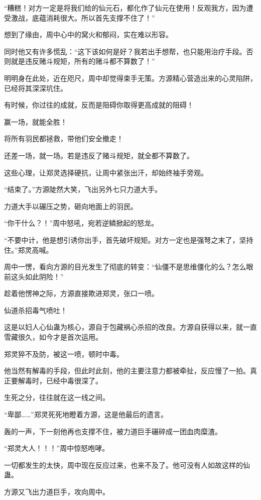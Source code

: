 \begin{this_body}
“糟糕！对方一定是将我们给的仙元石，都化作了仙元在使用！反观我方，因为遭受激战，底蕴消耗很大。所以首先支撑不住了！”

想到了缘由，周中心中的窝火和郁闷，实在难以形容。

同时他又有许多慌乱：“这下该如何是好？我若出手想帮，也只能用治疗手段。否则就是违反赌斗规矩，所有的赌斗都不算数了！”

明明身在此处，近在咫尺，周中却觉得束手无策。方源精心营造出来的心灵陷阱，已经将其深深坑住。

有时候，你过往的成就，反而是阻碍你取得更高成就的阻碍！

赢一场，就能全胜！

将所有羽民都拯救，带他们安全撤走！

还差一场，就一场。若是违反了赌斗规矩，就全都不算数了。

这些心理，让郑灵选择硬抗，让周中紧张出汗，却始终袖手旁观。

“结束了。”方源陡然大笑，飞出另外七只力道大手。

力道大手以碾压之势，砸向地面上的羽民。

“你干什么？！”周中怒吼，宛若逆鳞掀起的怒龙。

“不要中计，他是想引诱你出手，首先破坏规矩。对方一定也是强弩之末了，坚持住。”郑灵高喊。

周中一愣，看向方源的目光发生了彻底的转变：“仙僵不是思维僵化的么？怎么眼前这头如此阴险！”

趁着他愣神之际，方源直接欺进郑灵，张口一喷。

仙道杀招毒气喷吐！

这是以妇人心仙蛊为核心，源自于包藏祸心杀招的改良。方源自获得以来，就一直雪藏很久，如今才是首次运用。

郑灵猝不及防，被这一喷，顿时中毒。

他当然有解毒的手段，但此时此刻，他的主要注意力都被牵扯，反应慢了一拍。真正要解毒时，已经中毒很深了。

生死之分，往往就在这一线之间。

“卑鄙……”郑灵死死地瞪着方源，这是他最后的遗言。

轰的一声，下一刻他再也支撑不住，被力道巨手碾碎成一团血肉糜渣。

“郑灵大人！！！”周中惊怒咆哮。

一切都发生的太快，周中现在反应过来，也来不及了。他可没有人如故这样的仙蛊。

方源又飞出力道巨手，攻向周中。


\end{this_body}
